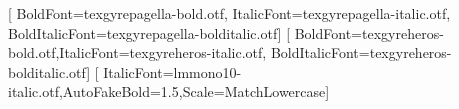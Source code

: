 \setmainfont{texgyrepagella-regular.otf}[
  BoldFont=texgyrepagella-bold.otf,
  ItalicFont=texgyrepagella-italic.otf,
  BoldItalicFont=texgyrepagella-bolditalic.otf]
\setsansfont{texgyreheros-regular.otf}[
  BoldFont=texgyreheros-bold.otf,ItalicFont=texgyreheros-italic.otf,
  BoldItalicFont=texgyreheros-bolditalic.otf]
\setmonofont{lmmono10-regular.otf}[
  ItalicFont=lmmono10-italic.otf,AutoFakeBold=1.5,Scale=MatchLowercase]
